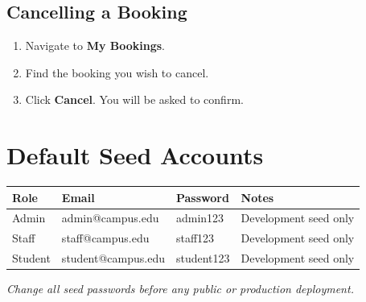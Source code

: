 \documentclass[12pt]{article}
\begin{document}
\subsection{Cancelling a Booking}
\begin{enumerate}
    \item Navigate to \textbf{My Bookings}.
    \item Find the booking you wish to cancel.
    \item Click \textbf{Cancel}. You will be asked to confirm.
\end{enumerate}

\section{Default Seed Accounts}

\begin{longtable}{|p{2.5cm}|p{4cm}|p{3cm}|p{4cm}|}
\hline
\textbf{Role} & \textbf{Email} & \textbf{Password} & \textbf{Notes} \\
\hline
Admin   & admin@campus.edu   & admin123   & Development seed only \\
\hline
Staff   & staff@campus.edu   & staff123   & Development seed only \\
\hline
Student & student@campus.edu & student123 & Development seed only \\
\hline
\end{longtable}

\textit{Change all seed passwords before any public or production deployment.}
\end{document}
